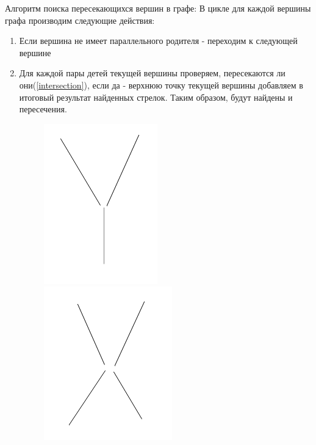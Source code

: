 Алгоритм поиска пересекающихся вершин в графе: \newline
В цикле для каждой вершины графа производим следующие действия:
\begin{enumerate}
	\item Если вершина не имеет параллельного родителя - переходим к следующей вершине
	\item Для каждой пары детей текущей вершины проверяем, пересекаются ли они(\ref{intersection}), если да - верхнюю точку текущей вершины добавляем в итоговый результат найденных стрелок. Таким образом, будут найдены  и  пересечения.
	\begin{figure}[!h]
		\centering
		\begin{minipage}{0.45\textwidth}
			\centering
			\includegraphics[width=0.7\linewidth]{pictures/Y_cross}
			\caption[Y]{}
			\label{fig:ycross}
		\end{minipage}
		\begin{minipage}{0.45\textwidth}
			\centering
			\includegraphics[width=0.7\linewidth]{pictures/X_cross}

\end{minipage}
\end{figure}
\end{enumerate}
